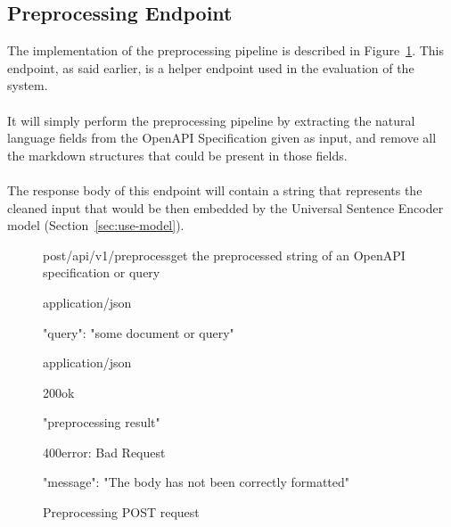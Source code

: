 \subsection{Preprocessing Endpoint}\label{subsec:preprocessing-endpoint}
The implementation of the preprocessing pipeline is described in Figure~\ref{fig:preprocessing-request}.
This endpoint, as said earlier, is a helper endpoint used in the evaluation of the system. \\ \\
It will simply perform the preprocessing pipeline by extracting the natural language fields from the OpenAPI Specification given as input, and remove all the markdown structures that could be present in those fields. \\ \\
The response body of this endpoint will contain a string that represents the cleaned input that would be then embedded by the Universal Sentence Encoder model (Section~\ref{sec:use-model}).

\begin{figure}[!h]
    \begin{apiRoute}{post}{/api/v1/preprocess}{get the preprocessed string of an OpenAPI specification or query}
        \begin{routeParameter}
        \end{routeParameter}

        \begin{routeRequest}{application/json}
            \begin{routeRequestBody}
{
    "query": "some document or query"
}
            \end{routeRequestBody}
        \end{routeRequest}

        \begin{routeResponse}{application/json}
            \begin{routeResponseItem}{200}{ok}
                \begin{routeResponseItemBody}
"preprocessing result"
                \end{routeResponseItemBody}
            \end{routeResponseItem}

            \begin{routeResponseItem}{400}{error: Bad Request}
                \begin{routeResponseItemBody}
{
    "message": "The body has not been correctly formatted"
}
                \end{routeResponseItemBody}
            \end{routeResponseItem}
        \end{routeResponse}
    \end{apiRoute}

    \caption{Preprocessing POST request}
    \label{fig:preprocessing-request}
\end{figure}

